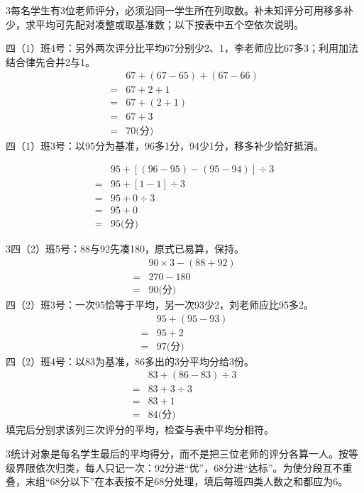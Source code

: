 \documentclass[multi=snippet,border={5bp 20bp 5bp 5bp}]{standalone}
\newenvironment{snippet}[3]{\begin{minipage}{#1bp}\color{answerred}\fontsize{#2}{#3}\selectfont\raggedright}{\end{minipage}}
\begin{document}
\begin{snippet}{505}{11.5}{14}\begin{multicols}{3}\raggedcolumns 每名学生有3位老师评分，必须沿同一学生所在列取数。补未知评分可用移多补少，求平均可先配对凑整或取基准数；以下按表中五个空依次说明。\par 四（1）班4号：另外两次评分比平均67分别少2、1，李老师应比67多3；利用加法结合律先合并2与1。\[\begin{aligned}&67+(67-65)+(67-66)\\={}&67+2+1\\={}&67+(2+1)\\={}&67+3\\={}&70\text{(分)}\end{aligned}\]四（1）班3号：以95分为基准，96多1分，94少1分，移多补少恰好抵消。\end{multicols}\[\begin{aligned}&95+[(96-95)-(95-94)]\div3\\={}&95+[1-1]\div3\\={}&95+0\div3\\={}&95+0\\={}&95\text{(分)}\end{aligned}\]\begin{multicols}{3}\raggedcolumns 四（2）班5号：88与92先凑180，原式已易算，保持。\[\begin{aligned}&90\times3-(88+92)\\={}&270-180\\={}&90\text{(分)}\end{aligned}\]四（2）班3号：一次95恰等于平均，另一次93少2，刘老师应比95多2。\[\begin{aligned}&95+(95-93)\\={}&95+2\\={}&97\text{(分)}\end{aligned}\]四（2）班4号：以83为基准，86多出的3分平均分给3份。\[\begin{aligned}&83+(86-83)\div3\\={}&83+3\div3\\={}&83+1\\={}&84\text{(分)}\end{aligned}\]填完后分别求该列三次评分的平均，检查与表中平均分相符。\end{multicols}\end{snippet}
\begin{snippet}{505}{11.5}{14}\begin{multicols}{3}\raggedcolumns 统计对象是每名学生最后的平均得分，而不是把三位老师的评分各算一人。按等级界限依次归类，每人只记一次：92分进“优”，68分进“达标”。为使分段互不重叠，末组“68分以下”在本表按不足68分处理，填后每班四类人数之和都应为6。\end{multicols}\end{snippet}
\end{document}
